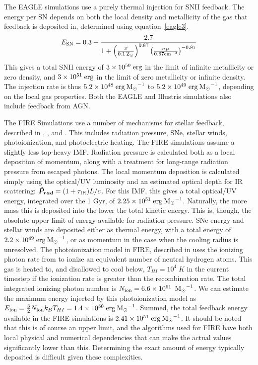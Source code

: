 The EAGLE simulations \citep{Crain2015} use a purely thermal
injection for SNII feedback.  The energy per SN depends on both the local
density and metallicity of the gas that feedback is deposited in, determined
using equation~\ref{eagle3}.
\begin{equation}
    E_{\rm SN} = 0.3 +
    \frac{2.7}{1+\left(\frac{Z}{0.1\>{\rm Z_{\odot}}}\right)^{0.87}\left(\frac{n_H}{0.67\rm{cm}^{-3}}\right)^{-0.87}}
    \label{eagle3}
\end{equation}
This gives a total SNII energy of $3\times10^{50}\;\rm{erg}$ in the limit of
infinite metallicity or zero density, and $3\times10^{51}\;\rm{erg}$ in the
limit of zero metallicity or infinite density.  The injection rate is thus
$5.2\times10^{48}\;\rm{erg}\>{\rm M_{\odot}}^{-1}$ to
$5.2\times10^{49}\;\rm{erg}\>{\rm M_{\odot}}^{-1}$, depending on the local gas properties.
Both the EAGLE and Illustris simulations also include feedback from AGN.  

The FIRE Simulations \citep{Hopkins2014} use a number of mechanisms for stellar
feedback, described in \cite{Hopkins2011}, \citet{Hopkins2012a}, and
\citet{Hopkins2012b}.  This includes radiation pressure, SNe, stellar
winds, photoionization, and photoelectric heating.  The FIRE simulations assume
a slightly less top-heavy \citep{Kroupa2003} IMF.  Radiation pressure is
calculated both as a local deposition of momentum, along with a treatment for
long-range radiation pressure from escaped photons.  The local momentum
deposition is calculated simply using the optical/UV luminosity and an estimated
optical depth for IR scattering: $\boldsymbol{\dot P_{rad}} = (1+\tau_{\rm IR})L/c$.
For this IMF, this gives a total optical/UV energy, integrated over the 1 Gyr,
of $2.25\times10^{51}\;\rm{erg}\>{\rm M_{\odot}}^{-1}$.  Naturally, the more mass this is
deposited into the lower the total kinetic energy.  This is, though, the
absolute upper limit of energy available for radiation pressure.  SNe
energy and stellar winds are deposited either as thermal energy, with a total
energy of $2.2\times10^{49}\;\rm{erg}\>{\rm M_{\odot}}^{-1}$, or as momentum in the case
when the cooling radius is unresolved.  The photoionization model in FIRE,
described in \citet{Hopkins2012a} uses the ionizing photon rate from
\citet{Leitherer1999} to ionize an equivalent number of neutral hydrogen atoms.  This
gas is heated to, and disallowed to cool below, $T_{HI}=10^4\;K$ in the current
timestep if the ionization rate is greater than the recombination rate.  The
total integrated ionizing photon number is $N_{\rm ion} =
6.6\times10^{61}\;\>{\rm M_{\odot}}^{-1}$.  We can estimate the maximum energy injected by
this photoionization model as $E_{\rm ion} = \frac{3}{2}N_{\rm ion}k_BT_{HI} =
1.4\times10^{50}\;\rm{erg}\>{\rm M_{\odot}}^{-1}$.  Summed, the total feedback energy
available in the FIRE simulations is $2.41\times10^{51}\;\rm{erg}\>{\rm M_{\odot}}^{-1}$.
It should be noted that this is of course an upper limit, and the algorithms
used for FIRE have both local physical and numerical dependencies that can make
the actual values significantly lower than this.  Determining the exact amount
of energy typically deposited is difficult given these complexities.

